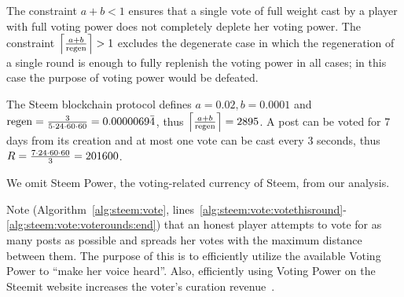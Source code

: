 \begin{remark}
  The constraint $a + b < 1$ ensures that a single vote of full weight cast by a
  player with full voting power does not completely deplete her voting power.
  The constraint $\ceil*{\frac{a + b}{\regen}} > 1$ excludes the degenerate
  case in which the regeneration of a single round is enough to fully replenish
  the voting power in all cases; in this case the purpose of voting power would
  be defeated.
\end{remark}

\begin{remark}
  The Steem blockchain protocol defines $a = 0.02, b = 0.0001$ and $\regen =
  \frac{3}{5 \cdot 24 \cdot 60 \cdot 60} = 0.0000069\bar{4}$, thus
  $\ceil*{\frac{a + b}{\regen}} = 2895$. A post can be voted for 7 days from its
  creation and at most one vote can be cast every 3 seconds, thus $\rounds =
  \frac{7 \cdot 24 \cdot 60 \cdot 60}{3} = 201600$.
\end{remark}

\begin{remark}
  We omit Steem Power, the voting-related currency of Steem, from our analysis.
\end{remark}

\begin{remark}
  Note (Algorithm~\ref{alg:steem:vote},
  lines~\ref{alg:steem:vote:votethisround}-\ref{alg:steem:vote:voterounds:end})
  that an honest player attempts to vote for as many posts as possible and
  spreads her votes with the maximum distance between them. The purpose of this
  is to efficiently utilize the available Voting Power to ``make her voice
  heard''. Also, efficiently using Voting Power on the Steemit website increases
  the voter's curation revenue~\cite{curationRewards}.
\end{remark}
